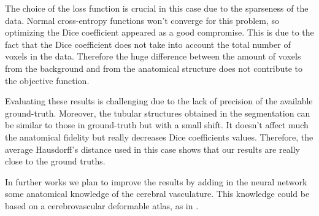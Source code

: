 \documentclass{article}
\begin{document}
The choice of the loss function is crucial in this case due to the sparseness of the data. Normal cross-entropy functions won't converge for this problem, so optimizing the Dice coefficient appeared as a good compromise. This is due to the fact that the Dice coefficient does not take into account the total number of voxels in the data. Therefore the huge difference between the amount of voxels from the background and from the anatomical structure does not contribute to the objective function.

Evaluating these results is challenging due to the lack of precision of the available ground-truth. Moreover, the tubular structures obtained in the segmentation can be similar to those in ground-truth but with a small shift. It doesn't affect much the anatomical fidelity but really decreases Dice coefficients values. Therefore, the average Hausdorff's distance used in this case shows that our results are really close to the ground truths.

In further works we plan to improve the results by adding in the neural network some anatomical knowledge of the cerebral vasculature. This knowledge could be based on a cerebrovascular deformable atlas, as in \cite{Dufour:2013}.






\end{document}
